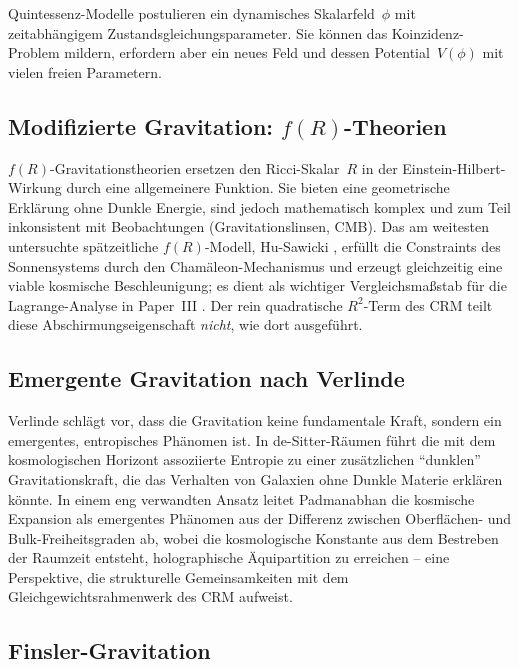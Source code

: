 \documentclass[aps,prd,twocolumn,superscriptaddress,nofootinbib]{revtex4-2}
\begin{document}
Quintessenz-Modelle \cite{Caldwell1998} postulieren ein dynamisches Skalarfeld~$\phi$ mit zeitabh\"angigem Zustandsgleichungsparameter. Sie k\"onnen das Koinzidenz-Problem mildern, erfordern aber ein neues Feld und dessen Potential~$V(\phi)$ mit vielen freien Parametern.

\subsection{Modifizierte Gravitation: $f(R)$-Theorien}

$f(R)$-Gravitationstheorien \cite{Starobinsky1980, Sotiriou2010} ersetzen den Ricci-Skalar~$R$ in der Einstein-Hilbert-Wirkung durch eine allgemeinere Funktion. Sie bieten eine geometrische Erkl\"arung ohne Dunkle Energie, sind jedoch mathematisch komplex und zum Teil inkonsistent mit Beobachtungen (Gravitationslinsen, CMB). Das am weitesten untersuchte sp\"atzeitliche $f(R)$-Modell, Hu-Sawicki \cite{HuSawicki2007}, erf\"ullt die Constraints des Sonnensystems durch den Cham\"aleon-Mechanismus und erzeugt gleichzeitig eine viable kosmische Beschleunigung; es dient als wichtiger Vergleichsma\ss{}stab f\"ur die Lagrange-Analyse in Paper~III \cite{Geiger2026c}. Der rein quadratische $R^2$-Term des CRM teilt diese Abschirmungseigenschaft \textit{nicht}, wie dort ausgef\"uhrt.

\subsection{Emergente Gravitation nach Verlinde}

Verlinde \cite{Verlinde2011, Verlinde2017} schl\"agt vor, dass die Gravitation keine fundamentale Kraft, sondern ein emergentes, entropisches Ph\"anomen ist. In de-Sitter-R\"aumen f\"uhrt die mit dem kosmologischen Horizont assoziierte Entropie zu einer zus\"atzlichen ``dunklen'' Gravitationskraft, die das Verhalten von Galaxien ohne Dunkle Materie erkl\"aren k\"onnte. In einem eng verwandten Ansatz leitet Padmanabhan \cite{Padmanabhan2012} die kosmische Expansion als emergentes Ph\"anomen aus der Differenz zwischen Oberfl\"achen- und Bulk-Freiheitsgraden ab, wobei die kosmologische Konstante aus dem Bestreben der Raumzeit entsteht, holographische \"Aquipartition zu erreichen -- eine Perspektive, die strukturelle Gemeinsamkeiten mit dem Gleichgewichtsrahmenwerk des CRM aufweist.

\subsection{Finsler-Gravitation}
\end{document}
